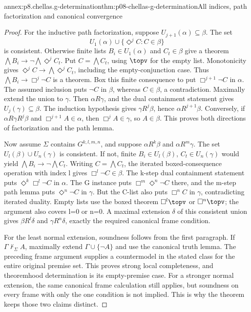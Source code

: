 \begin{annexitem}{annex:p8.chellas.g-determination}{thm:p08-chellas-g-determination}{All indices, path factorization and canonical convergence}
\begin{proof}
For the inductive path factorization, suppose
\(U_{j+1}(\alpha)\subseteq\beta\). The set
\[
 U_1(\alpha)\cup\{\Diamond^j C:C\in\beta\}
\]
is consistent. Otherwise finite lists \(B_i\in U_1(\alpha)\)
and \(C_t\in\beta\) give a theorem
\(\bigwedge B_i\to\neg\bigwedge\Diamond^j C_t\).
Put \(C=\bigwedge C_t\), using \(\topv\) for the empty list.
Monotonicity gives
\(\Diamond^j C\to\bigwedge\Diamond^j C_t\), including the
empty-conjunction case. Thus
\(\bigwedge B_i\to\Box^j\neg C\) is a theorem. Box this finite
consequence to put \(\Box^{j+1}\neg C\) in \(\alpha\).
The assumed inclusion puts \(\neg C\) in \(\beta\), whereas
\(C\in\beta\), a contradiction. Maximally extend the union to
\(\gamma\). Then \(\alpha R\gamma\), and the dual containment
statement gives \(U_j(\gamma)\subseteq\beta\). The induction
hypothesis gives \(\gamma R^j\beta\), hence
\(\alpha R^{j+1}\beta\). Conversely, if
\(\alpha R\gamma R^j\beta\) and \(\Box^{j+1}A\in\alpha\),
then \(\Box^j A\in\gamma\), so \(A\in\beta\).
This proves both directions of factorization and the path lemma.

Now assume \(\Sigma\) contains \(G^{k,l,m,n}\), and suppose
\(\alpha R^k\beta\) and \(\alpha R^m\gamma\). The set
\(U_l(\beta)\cup U_n(\gamma)\) is consistent. If not,
finite \(B_i\in U_l(\beta)\), \(C_t\in U_n(\gamma)\)
would yield \(\bigwedge B_i\to\neg\bigwedge C_t\).
Writing \(C=\bigwedge C_t\), the iterated boxed-consequence
operation with index l gives \(\Box^l\neg C\in\beta\).
The k-step dual containment statement puts
\(\Diamond^k\Box^l\neg C\) in \(\alpha\). The G instance puts
\(\Box^m\Diamond^n\neg C\) there, and the m-step path lemma
puts \(\Diamond^n\neg C\) in \(\gamma\). But the C-list
also puts \(\Box^n C\) in \(\gamma\), contradicting iterated
duality. Empty lists use the boxed theorem \(\Box^l\topv\) or
\(\Box^n\topv\); the argument also covers l=0 or n=0.
A maximal extension \(\delta\) of this consistent union gives
\(\beta R^l\delta\) and \(\gamma R^n\delta\), exactly
the required canonical frame condition.

For the least normal extension, soundness follows from the first
paragraph. If \(\Gamma\not\vdash_\Sigma A\), maximally extend
\(\Gamma\cup\{\neg A\}\) and use the canonical truth lemma.
The preceding frame argument supplies a countermodel in the stated
class for the entire original premise set. This proves strong local
completeness, and theoremhood determination is its empty-premise case.
For a stronger normal extension, the same canonical frame calculation
still applies, but soundness on every frame with only the one condition
is not implied. This is why the theorem keeps those two claims distinct.
\end{proof}
\end{annexitem}

